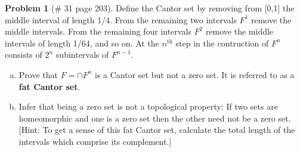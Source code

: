 \documentclass{article}
\theoremstyle{definition}
\newtheorem*{prob}{Problem}
\theoremstyle{theorem}
\begin{document}
\begin{prob}[\# 31  page 203]
    Define the Cantor set by removing from [0,1] the middle interval of length 1/4. From the remaining two intervals $F^1$ remove the middle intervals. From the remaining four intervals $F^2$ remove the middle intervals of length 1/64, and so on. At the $n^{\text{th} }$ step in the contruction of $F^n$ consists of $2^n$ subintervals of $F^{n-1 }$.
    \begin{enumerate}[(a)]
        \item Prove that $F = \cap F^n$ is a Cantor set but not a zero set. It is referred to as a \textbf{fat Cantor set}.
        \item Infer that being a zero set is not a topological property: If two sets are homeomorphic and one is a zero set then the other need not be a zero set. [Hint: To get a sense of this fat Cantor set, calculate the total length of the intervals which comprise its complement.]
    \end{enumerate}
    \end{prob}
\end{document}
